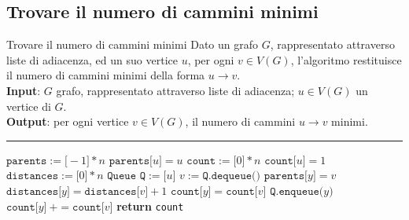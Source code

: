 \documentclass[a4paper, 12pt]{report}
\begin{document}
    \subsection{Trovare il numero di cammini minimi}

    \begin{framedalgo}[breakable]{Trovare il numero di cammini minimi}
        Dato un grafo $G$, rappresentato attraverso liste di adiacenza, ed un suo vertice $u$, per ogni $v \in V(G)$, l'algoritmo restituisce il numero di cammini minimi della forma $u \rightarrow v$.\\
        \textbf{Input}: $G$ grafo, rappresentato attraverso liste di adiacenza; $u \in V(G)$ un vertice di $G$.\\
        \textbf{Output}: per ogni vertice $v \in V(G)$, il numero di cammini $u \rightarrow v$ minimi.

        \hrule
        \begin{algorithmic}[1]
                \State $\texttt{parents}:=\texttt{[}-1\texttt{]} * n$
                \State $\texttt{parents[}u\texttt{]} = u$
                \State $\texttt{count}:=\texttt{[}0\texttt{]} * n$
                \State $\texttt{count[}u\texttt{]}= 1$ 
                \State $\texttt{distances}:=\texttt{[}0\texttt{]} * n$
                \State $\texttt{Queue Q} := \texttt{[}u\texttt{]}$
                    \State $v := \texttt{Q.dequeue()}$
                         
                            \State $\texttt{parents[}y\texttt{]} = v$
                            \State $\texttt{distances[}y\texttt{]}=\texttt{distances[}v\texttt{]} + 1$
                            \State $\texttt{count[}y\texttt{]}=\texttt{count[}v\texttt{]}$
                            \State $\texttt{Q.enqueue(}y\texttt{)}$
                            \State $\texttt{count[}y\texttt{]} \ += \texttt{count[}v\texttt{]}$
                        \EndIf
                    \EndFor
                \EndWhile
                \State \textbf{return} \texttt{count}
            \EndFunction
        \end{algorithmic}
    \end{framedalgo}
\end{document}

